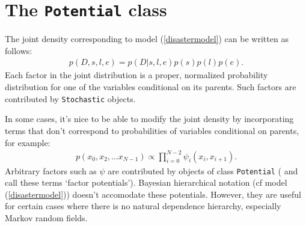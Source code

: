 \section{The \texttt{Potential} class}


The joint density corresponding to model (\ref{disastermodel}) can be written as follows:
\begin{eqnarray*}
    p(D,s,l,e) = p(D|s,l,e) p(s) p(l) p(e).
\end{eqnarray*}
Each factor in the joint distribution is a proper, normalized probability distribution for one of the variables conditional on its parents. Such factors are contributed by \texttt{Stochastic} objects.

In some cases, it's nice to be able to modify the joint density by incorporating terms that don't correspond to probabilities of variables conditional on parents, for example:
\begin{eqnarray*}
    p(x_0, x_2, \ldots x_{N-1}) \propto \prod_{i=0}^{N-2} \psi_i(x_i, x_{i+1}).
\end{eqnarray*}
Arbitrary factors such as $\psi$ are contributed by objects of class \texttt{Potential} (\cite{dawidmarkov} and \cite{jordangraphical} call these terms `factor potentials'). Bayesian hierarchical notation (cf model (\ref{disastermodel})) doesn't accomodate these potentials. However, they are useful for certain cases where there is no natural dependence hierarchy, especially Markov random fields.

